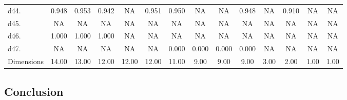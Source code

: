 \begin{table}
\begin{tabular}{lccccccccccccc}
d44.  & 0.948 & 0.953 & 0.942 & NA    & 0.951 & 0.950 & NA    & NA    & 0.948 & NA    & 0.910 & NA    & NA \\
d45.  & NA    & NA    & NA    & NA    & NA    & NA    & NA    & NA    & NA    & NA    & NA    & NA    & NA \\
d46.  & 1.000 & 1.000 & 1.000 & NA    & NA    & NA    & NA    & NA    & NA    & NA    & NA    & NA    & NA \\
d47.  & NA    & NA    & NA    & NA    & NA    & 0.000 & 0.000 & 0.000 & 0.000 & NA    & NA    & NA    & NA \\
\bottomrule Dimensions & 14.00 & 13.00 & 12.00 & 12.00 & 12.00 & 11.00 & 9.00  & 9.00  & 9.00  & 3.00  & 2.00  & 1.00  & 1.00 \\
\end{tabular}%
\end{table}%


\vspace*{8pt}




\subsection{Conclusion}

